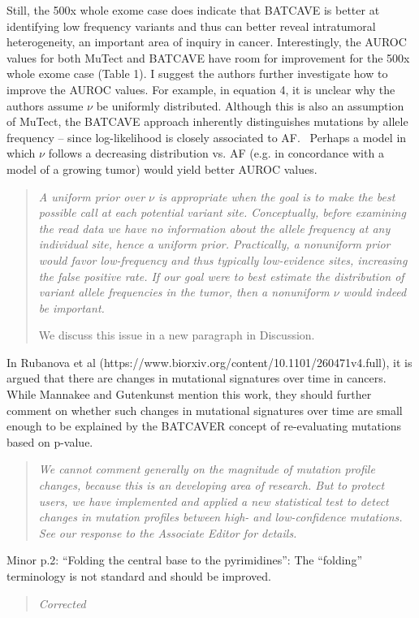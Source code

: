 \documentclass[11pt]{article}
\newenvironment{response}
{\begin{quote}\itshape}
{\end{quote}}
\begin{document}
Still, the 500x whole exome case does indicate that BATCAVE is better at identifying low frequency variants and thus can better reveal intratumoral heterogeneity, an important area of inquiry in cancer. Interestingly, the AUROC values for both MuTect and BATCAVE have room for improvement for the 500x whole exome case (Table 1). I suggest the authors further investigate how to improve the AUROC values. For example, in equation 4, it is unclear why the authors assume $\nu$ be uniformly distributed. Although this is also an assumption of MuTect, the BATCAVE approach inherently distinguishes mutations by allele frequency – since log-likelihood is closely associated to AF.  Perhaps a model in which $\nu$ follows a decreasing distribution vs. AF (e.g. in concordance with a model of a growing tumor) would yield better AUROC values.  
\begin{response}
A uniform prior over $\nu$ is appropriate when the goal is to make the best possible call at each potential variant site.
Conceptually, before examining the read data we have no information about the allele frequency at any individual site, hence a uniform prior.
Practically, a nonuniform prior would favor low-frequency and thus typically low-evidence sites, increasing the false positive rate.
If our goal were to best estimate the distribution of variant allele frequencies in the tumor, then a nonuniform $\nu$ would indeed be important.

We discuss this issue in a new paragraph in Discussion.
\end{response}

In Rubanova et al (https://www.biorxiv.org/content/10.1101/260471v4.full), it is argued that there are changes in mutational signatures over time in cancers. While Mannakee and Gutenkunst mention this work, they should further comment on whether such changes in mutational signatures over time are small enough to be explained by the BATCAVER concept of re-evaluating mutations based on p-value.
\begin{response}
We cannot comment generally on the magnitude of mutation profile changes, because this is an developing area of research.
But to protect users, we have implemented and applied a new statistical test to detect changes in mutation profiles between high- and low-confidence mutations.
See our response to the Associate Editor for details.
\end{response}

Minor
p.2: “Folding the central base to the pyrimidines”: The “folding” terminology is not standard and should be improved. 
\begin{response}
Corrected
\end{response}
\end{document}

